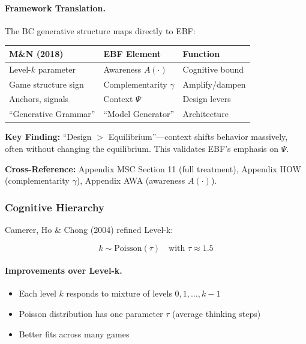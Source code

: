 \paragraph{Framework Translation.}
The BC generative structure maps directly to EBF:

\begin{center}
\renewcommand{\arraystretch}{1.3}
\begin{tabular}{@{}p{4.5cm}p{4.5cm}p{3.5cm}@{}}
\toprule
\textbf{M\&N (2018)} & \textbf{EBF Element} & \textbf{Function} \\
\midrule
Level-$k$ parameter & Awareness $A(\cdot)$ & Cognitive bound \\
Game structure sign & Complementarity $\gamma$ & Amplify/dampen \\
Anchors, signals & Context $\Psi$ & Design levers \\
``Generative Grammar'' & ``Model Generator'' & Architecture \\
\bottomrule
\end{tabular}
\end{center}

\textbf{Key Finding:} ``Design $>$ Equilibrium''---context shifts behavior massively,
often without changing the equilibrium. This validates EBF's emphasis on $\Psi$.

\textbf{Cross-Reference:} Appendix MSC Section 11 (full treatment),
Appendix HOW (complementarity $\gamma$), Appendix AWA (awareness $A(\cdot)$).

\subsubsection{Cognitive Hierarchy}

Camerer, Ho \& Chong (2004) refined Level-k:

\begin{equation}
\boxed{
k \sim \text{Poisson}(\tau) \quad \text{with } \tau \approx 1.5
}
\label{eq:ch}
\end{equation}

\paragraph{Improvements over Level-k.}
\begin{itemize}
    \item Each level $k$ responds to mixture of levels $0, 1, \ldots, k-1$
    \item Poisson distribution has one parameter $\tau$ (average thinking steps)
    \item Better fits across many games
\end{itemize}

